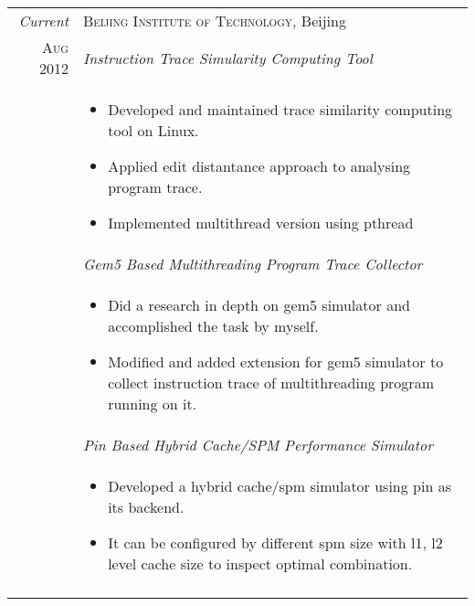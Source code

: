 \documentclass[a4paper,10pt]{article} %
\begin{document}
\begin{tabular}{r|p{11cm}}
\emph{Current} &  \textsc{Beijing Institute of Technology}, Beijing \smallskip\\
\textsc{Aug 2012} & \emph{Instruction Trace Simularity Computing Tool}\\ 
& \footnotesize{
\begin{itemize}
\item Developed and maintained trace similarity computing tool on Linux.
\item Applied edit distantance approach to analysing program trace.
\item Implemented multithread version using pthread
\end{itemize}
}\smallskip\\
& \emph{Gem5 Based Multithreading Program Trace Collector}\smallskip\\
& \footnotesize{
\begin{itemize}
\item Did a research in depth on gem5 simulator and accomplished the task by myself.
\item Modified and added extension for gem5 simulator to collect instruction trace of multithreading program running on it.
\end{itemize}
}\smallskip\\
& \emph{Pin Based Hybrid Cache/SPM Performance Simulator}\\
& \footnotesize{
\begin{itemize}
\item Developed a hybrid cache/spm simulator using pin as its backend. 
\item It can be configured by different spm size with l1, l2 level cache size to inspect optimal combination. 
\end{itemize}
}\\
\multicolumn{2}{c}{} \\




\end{tabular}
\end{document}
